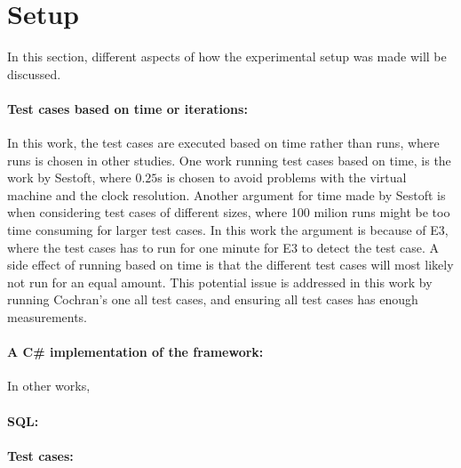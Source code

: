 \section*{Setup}

In this section, different aspects of how the experimental setup was made will be discussed.

\paragraph*{Test cases based on time or iterations:} In this work, the test cases are executed based on time rather than runs, where runs is chosen in other studies\cite*[]{Pereira2017,Koedijk2022diff,Georgiou2020}. One work running test cases based on time, is the work by Sestoft\cite*[]{sestoft2013microbenchmarks}, where $0.25$s is chosen to avoid problems with the virtual machine and the clock resolution. Another argument for time made by Sestoft\cite*[]{sestoft2013microbenchmarks} is when considering test cases of different sizes, where 100 milion runs might be too time consuming for larger test cases. In this work the argument is because of E3, where the test cases has to run for one minute for E3 to detect the test case. A side effect of running based on time is that the different test cases will most likely not run for an equal amount. This potential issue is addressed in this work by running Cochran's one all test cases, and ensuring all test cases has enough measurements. 

\paragraph*{A C\# implementation of the framework:} In other works,  

\paragraph*{SQL:}

\paragraph*{Test cases:}
